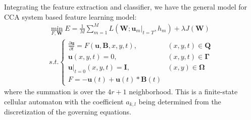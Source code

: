 \documentclass{amsart}
\theoremstyle{definition}
\theoremstyle{remark}
\numberwithin{equation}{section}
\begin{document}
Integrating the feature extraction and classifier, we have the general model for CCA system based feature learning model:
\begin{equation}
\begin{split}
\min_{F, \mathbf{W}} E = \frac{1}{M} \sum_{m=1}^M L(\mathbf{W}; \mathbf{u}_m|_{t=T}, h_m) + \lambda J(\mathbf{W}) \\
s.t.    \begin{cases}
    \frac{\partial \mathbf{u}}{\partial t} = F(\mathbf{u},  \mathbf{B}, x, y, t), &  (x, y, t) \in \mathbf{Q}\\
	\mathbf{u}(x, y, t) = 0, & (x, y, t) \in  \mathbf{\Gamma} \\
	\mathbf{u}|_{t=0}(x, y, t) = \mathbf{I}, & (x, y)\in \mathbf{\Omega} \\
	F = -  \mathbf{u}(t)  + \mathbf{u}(t) * \mathbf{B}(t)
  \end{cases} 
\end{split}
\end{equation}
where the summation is over the $4r + 1$ neighborhood.
This is a finite-state cellular automaton with the coefficient $a_{k, l}$ being determined from the discretization of the governing equations.






\end{document}
